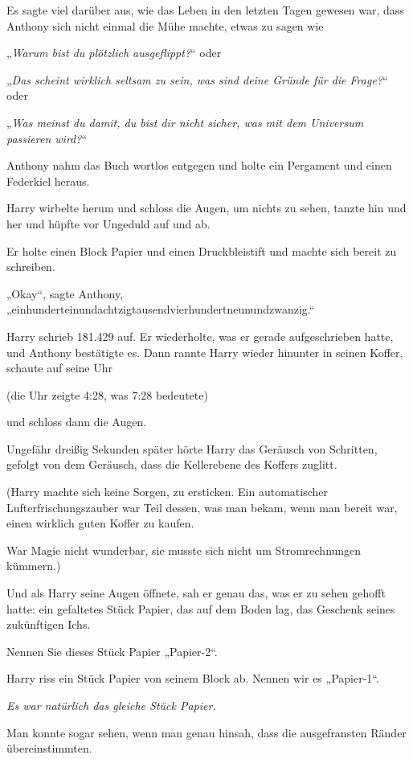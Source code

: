 {Es sagte viel darüber aus, wie das Leben in den letzten Tagen gewesen war, dass Anthony sich nicht einmal die Mühe machte, etwas zu sagen wie

„\emph{Warum bist du plötzlich ausgeflippt?}“ oder

„\emph{Das scheint wirklich seltsam zu sein, was sind deine Gründe für die Frage?}“ oder

„\emph{Was meinst du damit, du bist dir nicht sicher, was mit dem Universum passieren wird?}“

Anthony nahm das Buch wortlos entgegen und holte ein Pergament und einen Federkiel heraus.

Harry wirbelte herum und schloss die Augen, um nichts zu sehen, tanzte hin und her und hüpfte vor Ungeduld auf und ab.

Er holte einen Block Papier und einen Druckbleistift und machte sich bereit zu schreiben.

„Okay“, sagte Anthony, „einhunderteinundachtzigtausendvierhundertneunundzwanzig.“

Harry schrieb 181.429 auf. Er wiederholte, was er gerade aufgeschrieben hatte, und Anthony bestätigte es. Dann rannte Harry wieder hinunter in seinen Koffer, schaute auf seine Uhr

(die Uhr zeigte 4:28, was 7:28 bedeutete)

und schloss dann die Augen.

Ungefähr dreißig Sekunden später hörte Harry das Geräusch von Schritten, gefolgt von dem Geräusch, dass die Kellerebene des Koffers zuglitt.

(Harry machte sich keine Sorgen, zu ersticken. Ein automatischer Lufterfrischungszauber war Teil dessen, was man bekam, wenn man bereit war, einen wirklich guten Koffer zu kaufen.

War Magie nicht wunderbar, sie musste sich nicht um Stromrechnungen kümmern.)

Und als Harry seine Augen öffnete, sah er genau das, was er zu sehen gehofft hatte: ein gefaltetes Stück Papier, das auf dem Boden lag, das Geschenk seines zukünftigen Ichs.

Nennen Sie dieses Stück Papier „Papier-2“.

Harry riss ein Stück Papier von seinem Block ab. Nennen wir es „Papier-1“.

\emph{Es war natürlich das gleiche Stück Papier.}

Man konnte sogar sehen, wenn man genau hinsah, dass die ausgefransten Ränder übereinstimmten.

}
